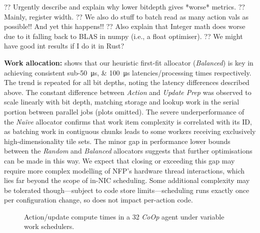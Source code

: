 \documentclass[sigconf,natbib=false]{acmart}
\newcommand{\fakepara}[1]{\noindent\textbf{#1:}}
\newcommand{\Coopfw}{\emph{CoOp}}
\begin{document}
?? Urgently describe and explain why lower bitdepth gives *worse* metrics.
?? Mainly, register width.
?? We also do stuff to batch read as many action vals as possible!! And yet this happens!!
?? Also explain that Integer math does worse due to it falling back to BLAS in numpy (i.e., a float optimiser).
?? We might have good int results if I do it in Rust?

\fakepara{Work allocation}
 shows that our heuristic first-fit allocator (\emph{Balanced}) is key in achieving consistent sub-\SIlist{50;100}{\micro\second} latencies/processing times respectively.
The trend is repeated for all bit depths, noting the latency differences described above.
The constant difference between \emph{Action} and \emph{Update Prep} was observed to scale linearly with bit depth, matching storage and lookup work in the serial portion between parallel jobs (plots omitted).
The severe underperformance of the \emph{Na\"{i}ve} allocator confirms that work item complexity is correlated with its ID, as batching work in contiguous chunks leads to some workers receiving exclusively high-dimensionality tile sets.
The minor gap in performance lower bounds between the \emph{Random} and \emph{Balanced} allocators suggests that further optimisations can be made in this way.
We expect that closing or exceeding this gap may require more complex modelling of NFP's hardware thread interactions, which lies far beyond the scope of in-NIC scheduling.
Some additional complexity may be tolerated though---subject to code store limits---scheduling runs exactly once per configuration change, so does not impact per-action code.

\begin{figure}
	\caption{Action/update compute times in a \SI{32}{\bit} \Coopfw{} agent under variable work schedulers.\label{fig:work-alloc-32}}
\end{figure}
\end{document}
